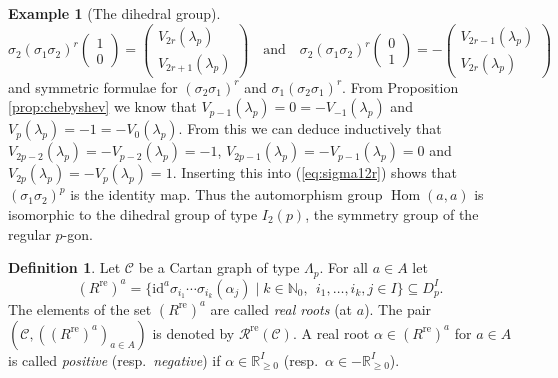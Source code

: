 \documentclass[11pt,a4paper]{amsart}
\theoremstyle{definition}
\newtheorem{Definition}[Lemma]{Definition}
\newtheorem{Example}[Lemma]{Example}
\numberwithin{equation}{section}
\newcommand{\id }{\mathrm{id}}
\DeclareMathOperator{\Hom}{Hom}
\newcommand{\re }{^\mathrm{re}}
\newcommand{\rer }[1]{(R\re)^{#1}}
\newcommand{\rsC }{\mathcal{R}}
\newcommand{\Cc }{\mathcal{C}}
\newcommand{\s }{\sigma }
\newcommand{\Ri}{D_p}
\begin{document}
\begin{Example}[The dihedral group]
\begin{equation} \label{eq:sigma212r}
\sigma_2(\sigma_1\sigma_2)^r \begin{pmatrix} 1\\0 
\end{pmatrix} = \begin{pmatrix} V_{2r}(\lambda_p)
\\ V_{2r+1}(\lambda_p) \end{pmatrix}
\mbox{~~~and~~~}
\sigma_2(\sigma_1\sigma_2)^r \begin{pmatrix} 0\\1 
\end{pmatrix} = - \begin{pmatrix} V_{2r-1}(\lambda_p)
\\ V_{2r}(\lambda_p) \end{pmatrix}
\end{equation}
and symmetric formulae for $(\sigma_2\sigma_1)^r$
and $\sigma_1(\sigma_2\sigma_1)^r$.
From Proposition \ref{prop:chebyshev} we know that 
$V_{p-1}(\lambda_p) = 0 = -V_{-1}(\lambda_p)$ and
$V_p(\lambda_p)= -1 = -V_0(\lambda_p)$. From this we
can deduce inductively that $V_{2p-2}(\lambda_p)=
-V_{p-2}(\lambda_p) =-1$, $V_{2p-1}(\lambda_p)=
-V_{p-1}(\lambda_p) =0$ and 
$V_{2p}(\lambda_p)=
-V_{p}(\lambda_p) =1$. Inserting this into 
(\ref{eq:sigma12r}) shows that 
$(\sigma_1\sigma_2)^p$ is the identity map. 
Thus the automorphism group 
$\Hom(a,a)$ is isomorphic to the dihedral group of type $I_2(p)$, the symmetry group of the regular $p$-gon. 
\end{Example}

\begin{Definition}\label{def:realroots}
Let $\Cc $ be a Cartan graph of type $\Lambda_p$. 
For all $a\in A$ let
\[ \rer a=\{ \id ^a \s _{i_1}\cdots \s_{i_k}(\alpha_j) \mid
k\in \mathbb{N} _0,\:\: i_1,\dots,i_k,j\in I\}\subseteq \Ri^I.\]
The elements of the set $\rer a$ are called \emph{real roots} (at $a$).
The pair $(\Cc ,(\rer a)_{a\in A})$ is denoted by $\rsC \re (\Cc )$.
A real root $\alpha\in \rer a$ for $a\in A$ is called \emph{positive}
(resp.\ \emph{negative}) if $\alpha\in \mathbb{R}_{\ge 0}^I$ (resp.\ $\alpha\in -\mathbb{R}_{\ge 0}^I$).
\end{Definition}
\end{document}
